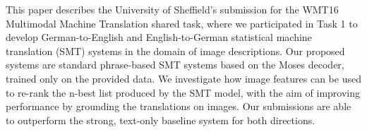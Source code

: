 This paper describes the University of Sheffield's submission for the WMT16 Multimodal Machine Translation shared task, where we participated in Task 1 to develop German-to-English and English-to-German statistical machine translation (SMT) systems in the domain of image descriptions. Our proposed systems are standard phrase-based SMT systems based on the Moses decoder, trained only on the provided data. We investigate how image features can be used to re-rank the n-best list produced by the SMT model, with the aim of improving performance by grounding the translations on images. Our submissions are able to outperform the strong, text-only baseline system for both directions.

